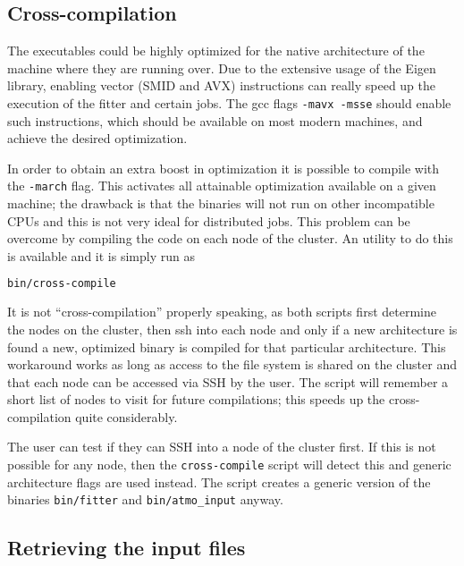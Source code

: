 \documentclass[a4paper, 11pt]{article}
\begin{document}
\subsection{Cross-compilation}

The executables could be highly optimized for the native architecture of the machine where they are running over.
Due to the extensive usage of the Eigen library, enabling vector (SMID and AVX) instructions can really speed up %
the execution of the fitter and certain jobs.
The gcc flags \texttt{-mavx -msse} should enable such instructions, which should be available on %
most modern machines, and achieve the desired optimization.

In order to obtain an extra boost in optimization it is possible to compile with the \texttt{-march} flag.
This activates all attainable optimization available on a given machine; the drawback is that the binaries will not %
run on other incompatible CPUs and this is not very ideal for distributed jobs.
This problem can be overcome by compiling the code on each node of the cluster.
An utility to do this is available and it is simply run as
\begin{lstlisting}[language=bash]
    bin/cross-compile
\end{lstlisting}
It is not ``cross-compilation'' properly speaking, as both scripts first determine the nodes %
on the cluster, then ssh into each node and only if a new architecture is found a new, optimized binary is compiled %
for that particular architecture.
This workaround works as long as access to the file system is shared on the cluster and that each node can %
be accessed via SSH by the user.
The script will remember a short list of nodes to visit for future compilations; this speeds up the cross-compilation %
quite considerably.

The user can test if they can SSH into a node of the cluster first.
If this is not possible for any node, then the \texttt{cross-compile} script will detect this %
and generic architecture flags are used instead.
The script creates a generic version of the binaries \texttt{bin/fitter} and \texttt{bin/atmo\_input} anyway.

\subsection{Retrieving the input files}
\label{sec:download}
\end{document}
